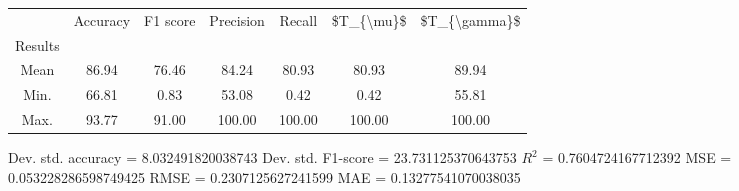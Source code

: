 \begin{tabular}{|c|c|c|c|c|c|c|}
\toprule
{} &  Accuracy &  F1 score &  Precision &  Recall &  \$T\_\{\textbackslash mu\}\$ &  \$T\_\{\textbackslash gamma\}\$ \\
Results &           &           &            &         &            &               \\
\hline
Mean    &     86.94 &     76.46 &      84.24 &   80.93 &      80.93 &         89.94 \\
Min.    &     66.81 &      0.83 &      53.08 &    0.42 &       0.42 &         55.81 \\
Max.    &     93.77 &     91.00 &     100.00 &  100.00 &     100.00 &        100.00 \\
\bottomrule
\end{tabular}

 Dev. std. accuracy = 8.032491820038743
 Dev. std. F1-score = 23.731125370643753
 $R^2$ = 0.7604724167712392
 MSE = 0.053228286598749425
 RMSE = 0.2307125627241599
 MAE = 0.13277541070038035